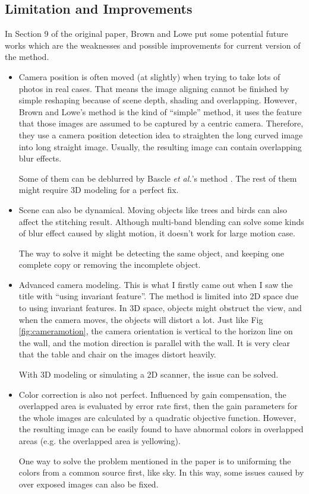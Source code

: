 \documentclass[10pt,twocolumn,letterpaper]{article}
\begin{document}
\subsection{Limitation and Improvements}
In Section 9 of the original paper, Brown and Lowe put some potential future works which are the weaknesses and possible improvements for current version of the method.
\begin{itemize}
    \item
        Camera position is often moved (at slightly) when trying to take lots of photos in real cases.
        That means the image aligning cannot be finished by simple reshaping because of scene depth, shading and overlapping.
        However, Brown and Lowe's method is the kind of ``simple'' method, it uses the feature that those images are assumed to be captured by a centric camera.
        Therefore, they use a camera position detection idea to straighten the long curved image into long straight image.
        Usually, the resulting image can contain overlapping blur effects.

        Some of them can be deblurred by Bascle \textit{et al.}'s method \cite{bascle}.
        The rest of them might require 3D modeling for a perfect fix.
    \item
        Scene can also be dynamical. Moving objects like trees and birds can also affect the stitching result.
        Although multi-band blending can solve some kinds of blur effect caused by slight motion,
        it doesn't work for large motion case.

        The way to solve it might be detecting the same object, and keeping one complete copy or removing the incomplete object.
    \item
        Advanced camera modeling. This is what I firstly came out when I saw the title with ``using invariant feature''.
        The method is limited into 2D space due to using invariant features.
        In 3D space, objects might obstruct the view, and when the camera moves, the objects will distort a lot.
        Just like Fig \ref{fig:cameramotion}, the camera orientation is vertical to the horizon line on the wall, and the motion direction is parallel with the wall.
        It is very clear that the table and chair on the images distort heavily.
        
        With 3D modeling or simulating a 2D scanner, the issue can be solved.
    \item
        Color correction is also not perfect.
        Influenced by gain compensation, the overlapped area is evaluated by error rate first,
        then the gain parameters for the whole images are calculated by a quadratic objective function.
        However, the resulting image can be easily found to have abnormal colors in overlapped areas (e.g. the overlapped area is yellowing).

        One way to solve the problem mentioned in the paper is to uniforming the colors from a common source first, like sky.
        In this way, some issues caused by over exposed images can also be fixed.
\end{itemize}
\end{document}
